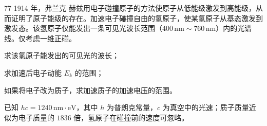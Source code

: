 \begin{problem}{77}
    1914 年，弗兰克-赫兹用电子碰撞原子的方法使原子从低能级激发到高能级，从而证明了原子能级的存在。加速电子碰撞自由的氢原子，使某氢原子从基态激发到激发态。该氢原子仅能发出一条可见光波长范围（$400\,\mathrm{nm} \sim 760\,\mathrm{nm}$）内的光谱线。仅考虑一维正碰。
    \begin{subproblem}
        求该氢原子能发出的可见光的波长；
    \end{subproblem}
    \begin{subproblem}
        求加速后电子动能 $E_{k}$ 的范围；
    \end{subproblem}
    \begin{subproblem}
        如果将电子改为质子，求加速质子的加速电压的范围。
    \end{subproblem}
    已知 $hc = 1240\,\mathrm{nm \cdot eV}$，其中 $h$ 为普朗克常量，$c$ 为真空中的光速；质子质量近似为电子质量的 $1836$ 倍，氢原子在碰撞前的速度可忽略。
\end{problem}